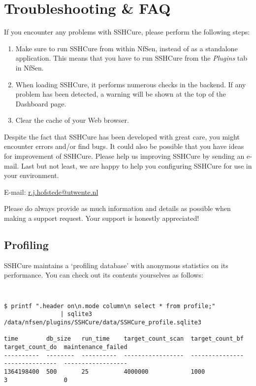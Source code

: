 \cleardoublepage

\section{Troubleshooting \& FAQ}
\label{sec:troubleshooting_faq}

If you encounter any problems with SSHCure, please perform the following steps:

\begin{enumerate}
	\item Make sure to run SSHCure from within NfSen, instead of as a standalone application. This means that you have to run SSHCure from the \emph{Plugins} tab in NfSen.
	
	\item When loading SSHCure, it performs numerous checks in the backend. If any problem has been detected, a warning will be shown at the top of the Dashboard page.
	
	\item Clear the cache of your Web browser.
\end{enumerate}

Despite the fact that SSHCure has been developed with great care, you might encounter errors and/or find bugs. It could also be possible that you have ideas for improvement of SSHCure. Please help us improving SSHCure by sending an e-mail. Last but not least, we are happy to help you configuring SSHCure for use in your environment.

\vspace{3mm}
E-mail: \url{r.j.hofstede@utwente.nl}
\vspace{3mm}
	
Please do always provide as much information and details as possible when making a support request. Your support is honestly appreciated!

\subsection{Profiling}

SSHCure maintains a `profiling database' with anonymous statistics on its performance. You can check out its contents yourselves as follows:

{\tt\small
\begin{verbatim}
$ printf ".header on\n.mode column\n select * from profile;" 
                | sqlite3 /data/nfsen/plugins/SSHCure/data/SSHCure_profile.sqlite3

time        db_size   run_time    target_count_scan  target_count_bf  target_count_do  maintenance_failed
----------  --------  ----------  -----------------  ---------------  ---------------  ------------------
1364198400  500       25          4000000            1000             3                0                 

\end{verbatim}
}


